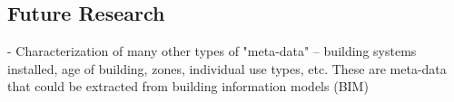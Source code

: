 \subsection{Future Research}
\label{sec:futureresearch}

- Characterization of many other types of "meta-data" -- building systems installed, age of building, zones, individual use types, etc. These are meta-data that could be extracted from building information models (BIM)
